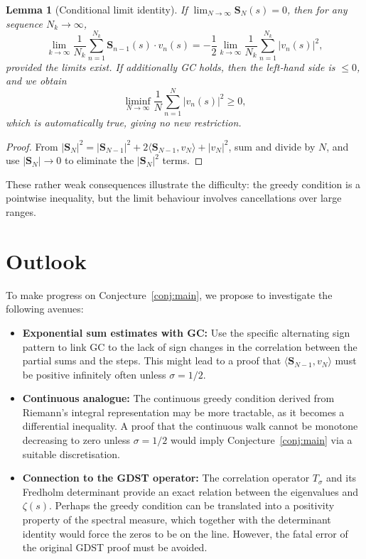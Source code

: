 \documentclass[11pt,a4paper]{article}
\newtheorem{lemma}[theorem]{Lemma}
\begin{document}
\begin{lemma}[Conditional limit identity]\label{lem:limit}
If $\lim_{N\to\infty}\mathbf{S}_N(s)=0$, then for any sequence $N_k\to\infty$,
\[
\lim_{k\to\infty} \frac{1}{N_k}\sum_{n=1}^{N_k} \mathbf{S}_{n-1}(s)\cdot v_n(s) = -\frac12\lim_{k\to\infty}\frac{1}{N_k}\sum_{n=1}^{N_k}|v_n(s)|^2,
\]
provided the limits exist.  If additionally GC holds, then the left‑hand side is $\le 0$, and we obtain
\[
\liminf_{N\to\infty}\frac{1}{N}\sum_{n=1}^{N} |v_n(s)|^2 \ge 0,
\]
which is automatically true, giving no new restriction.
\end{lemma}
\begin{proof}
From $|\mathbf{S}_N|^2 = |\mathbf{S}_{N-1}|^2 + 2\langle\mathbf{S}_{N-1},v_N\rangle + |v_N|^2$, sum and divide by $N$, and use $|\mathbf{S}_N|\to0$ to eliminate the $|\mathbf{S}_N|^2$ terms.
\end{proof}

These rather weak consequences illustrate the difficulty: the greedy condition is a pointwise inequality, but the limit behaviour involves cancellations over large ranges.

\section{Outlook}
To make progress on Conjecture~\ref{conj:main}, we propose to investigate the following avenues:
\begin{itemize}
    \item \textbf{Exponential sum estimates with GC:} Use the specific alternating sign pattern to link GC to the lack of sign changes in the correlation between the partial sums and the steps.  This might lead to a proof that $\langle\mathbf{S}_{N-1},v_N\rangle$ must be positive infinitely often unless $\sigma=1/2$.
    \item \textbf{Continuous analogue:} The continuous greedy condition derived from Riemann's integral representation may be more tractable, as it becomes a differential inequality.  A proof that the continuous walk cannot be monotone decreasing to zero unless $\sigma=1/2$ would imply Conjecture~\ref{conj:main} via a suitable discretisation.
    \item \textbf{Connection to the GDST operator:} The correlation operator $T_\sigma$ and its Fredholm determinant provide an exact relation between the eigenvalues and $\zeta(s)$.  Perhaps the greedy condition can be translated into a positivity property of the spectral measure, which together with the determinant identity would force the zeros to be on the line.  However, the fatal error of the original GDST proof must be avoided.
\end{itemize}
\end{document}
